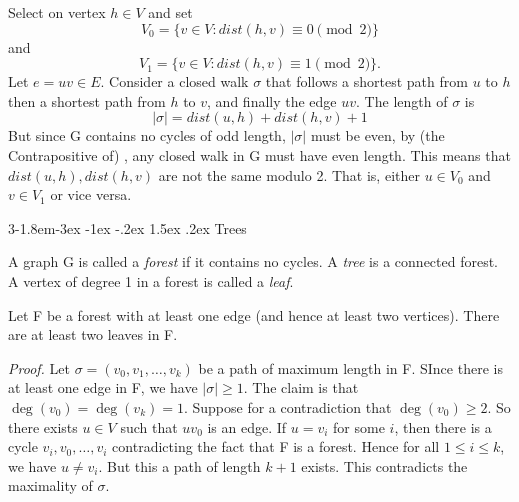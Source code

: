 \documentclass{tufte-handout}
\makeatletter
\renewcommand{\subsection}{\@startsection{subsection}%
    {3}{-1.8em}{-3ex \@plus -1ex \@minus -.2ex}%
    {1.5ex \@plus .2ex}
    {\hspace*{-5.5em}\fcolorbox{ltblue}{ltblue}{\parbox[c][1.0ex][b]{4em}{\phantom{space}}}
    \normalfont\large\itshape\color{ltblue}}}
\makeatother
\begin{document}
Select on vertex \( h\in V   \) and set
\[V_0 = \{v\in V: dist(h,v) \equiv 0 \pmod2\}\]
and
\[V_1 = \{v\in V: dist(h,v) \equiv 1 \pmod2\}.\]
Let \( e = uv \in E \). Consider a closed walk \(\sigma\) that follows a shortest path from \( u \) to \( h \)
then a shortest path from \( h \) to \( v \), and finally the edge \( uv \). The length of \(\sigma\) is
\[ \left|\sigma\right| = dist(u,h) + dist(h,v) + 1 \]
But since G contains no cycles of odd length, \(\left|\sigma\right|\) must be even, by (the Contrapositive of) ,
any closed walk in G must have even length. This means that \( dist(u,h),dist(h,v)\) are not the same modulo 2.
That is, either \(u \in V_0\) and \(v \in V_1\) or vice versa. \qedsymbol

\subsection{Trees}

A graph G is called a \textit{forest} if it contains no cycles. A \textit{tree} is a connected forest.
A vertex of degree 1 in a forest is called a \textit{leaf}.

\begin{Proposition}
    \label{prop:tree_leaves}
    Let F be a forest with at least one edge (and hence at least two vertices). There are at least two leaves in F.
\end{Proposition}

\textit{Proof.} Let \( \sigma = (v_0, v_1, \ldots, v_k) \) be a path of maximum length in F.
SInce there is at least one edge in F, we have \(\left|\sigma\right| \geq 1\).
The claim is that \( \deg(v_0) = \deg(v_k) = 1 \). Suppose for a contradiction that \( \deg(v_0) \geq 2 \).
So there exists \( u \in V\) such that \( uv_0\) is an edge. If \( u = v_i\) for some \( i \),
then there is a cycle \(v_i, v_0, \ldots, v_i\) contradicting the fact that F is a forest.
Hence for all \( 1 \leq i \leq k \), we have \( u \neq v_i \). But this a path of length \( k+1 \) exists.
This contradicts the maximality of \( \sigma \). \qedsymbol
{}
\end{document}

